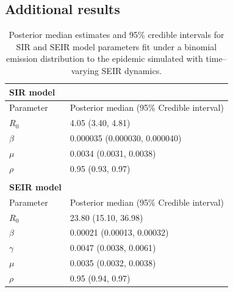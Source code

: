 \subsection{Additional results}
\label{subsec:bda_misspec_additional_results}
\begin{table}[htbp]
	\centering
	\begin{tabular}{ll}
		\textbf{SIR model} & \\
		\hline\hline
		Parameter & Posterior median (95\% Credible interval) \\ 
		\hline
		$ R_0 $ & 4.05 (3.40, 4.81) \\ 
		$\beta $ & 0.000035 (0.000030, 0.000040) \\ 
		$ \mu $ & 0.0034 (0.0031, 0.0038) \\ 
		$ \rho $ & 0.95 (0.93, 0.97) \\
		\hline & \\
		\textbf{SEIR model} & \\
		\hline\hline
		Parameter & Posterior median (95\% Credible interval) \\ 
		\hline 
		$ R_0 $ & 23.80 (15.10, 36.98) \\ 
		$ \beta $ & 0.00021 (0.00013, 0.00032) \\ 
		$ \gamma $ & 0.0047 (0.0038, 0.0061) \\ 
		$ \mu $ & 0.0035 (0.0032, 0.0038) \\ 
		$ \rho $ & 0.95 (0.94, 0.97) \\ 
		\hline
	\end{tabular}
	\caption[Simulation 2 posterior estimates for SIR and SEIR model parameters.]{Posterior median estimates and 95\% credible intervals for SIR and SEIR model parameters fit under a binomial emission distribution to the epidemic simulated with time--varying SEIR dynamics.}
\end{table}

